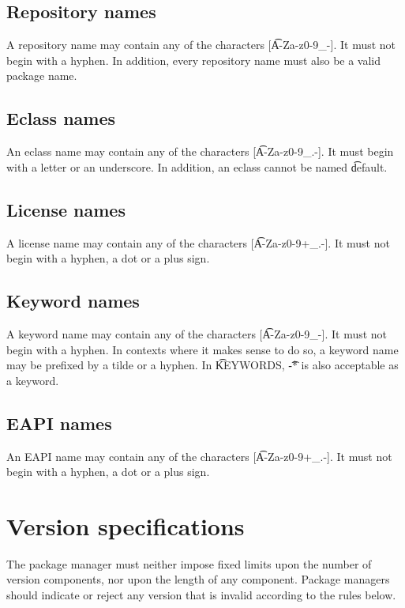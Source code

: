 \subsection{Repository names}
\label{sec:repository-names}
A repository name may contain any of the characters [\t{A-Za-z0-9_-}]. It must not begin with a
hyphen. In addition, every repository name must also be a valid package name.

\subsection{Eclass names}
\label{sec:eclass-names}
An eclass name may contain any of the characters [\t{A-Za-z0-9_.-}]. It must begin with a letter or
an underscore. In addition, an eclass cannot be named \t{default}.

\subsection{License names}
\label{sec:license-names}
A license name may contain any of the characters [\t{A-Za-z0-9+_.-}]. It must not begin with a
hyphen, a dot or a plus sign.

\subsection{Keyword names}
\label{sec:keyword-names}
A keyword name may contain any of the characters [\t{A-Za-z0-9_-}]. It must not begin with a
hyphen. In contexts where it makes sense to do so, a keyword name may be prefixed by
a tilde or a hyphen. In \t{KEYWORDS}, \t{-*} is also acceptable as a keyword.

\subsection{EAPI names}
\label{sec:eapi-names}
An EAPI name may contain any of the characters [\t{A-Za-z0-9+_.-}]. It must not begin with a
hyphen, a dot or a plus sign.

\section{Version specifications}
\label{sec:version-spec}
The package manager must neither impose fixed limits upon the number of version components, nor
upon the length of any component. Package managers should indicate or reject any version that is
invalid according to the rules below.

